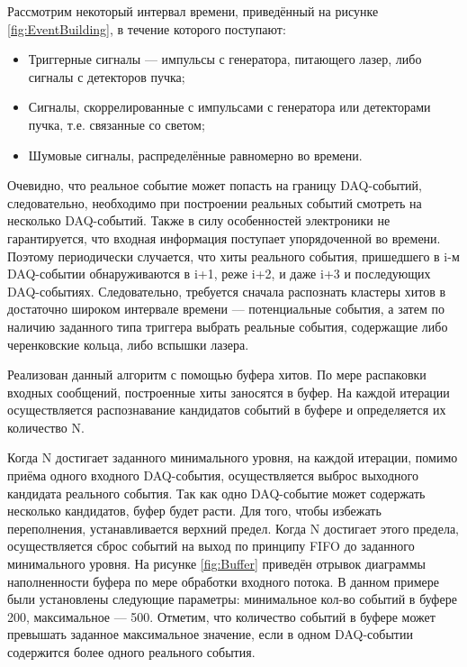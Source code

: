 Рассмотрим некоторый интервал времени, приведённый на рисунке \ref{fig:EventBuilding}, в течение которого поступают:
\begin{itemize}
\item {Триггерные сигналы --- импульсы с генератора, питающего лазер, либо сигналы с детекторов пучка;}
\item {Сигналы, скоррелированные с импульсами с генератора или детекторами пучка, т.е. связанные со светом;}
\item {Шумовые сигналы, распределённые равномерно во времени.}
\end{itemize}

Очевидно, что реальное событие может попасть на границу DAQ-событий, следовательно, необходимо при построении реальных событий смотреть на несколько DAQ-событий. Также в силу особенностей электроники не гарантируется, что входная информация поступает упорядоченной во времени. Поэтому периодически случается, что хиты реального события, пришедшего в i-м DAQ-событии обнаруживаются в i+1, реже i+2, и даже i+3 и последующих DAQ-событиях. Следовательно, требуется сначала распознать кластеры хитов в достаточно широком интервале времени --- потенциальные события, а затем по наличию заданного типа триггера выбрать реальные события, содержащие либо черенковские кольца, либо вспышки лазера.

Реализован данный алгоритм с помощью буфера хитов. По мере распаковки входных сообщений, построенные хиты заносятся в буфер. На каждой итерации осуществляется распознавание кандидатов событий в буфере и определяется их количество N.

Когда N достигает заданного минимального уровня, на каждой итерации, помимо приёма одного входного DAQ-события, осуществляется выброс выходного кандидата реального события. Так как одно DAQ-событие может содержать несколько кандидатов, буфер будет расти. Для того, чтобы избежать переполнения, устанавливается верхний предел. Когда N достигает этого предела, осуществляется сброс событий на выход по принципу FIFO до заданного минимального уровня. На рисунке \ref{fig:Buffer} приведён отрывок диаграммы наполненности буфера по мере обработки входного потока. В данном примере были установлены следующие параметры: минимальное кол-во событий в буфере 200, максимальное --- 500. Отметим, что количество событий в буфере может превышать заданное максимальное значение, если в одном DAQ-событии содержится более одного реального события.

